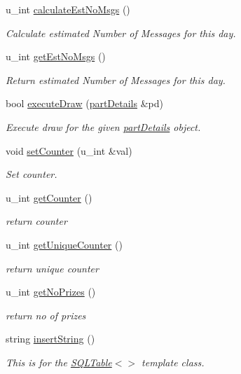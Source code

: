 \begin{CompactItemize}
u\_\-int \hyperlink{classDay_Daya6}{calculate\-Est\-No\-Msgs} ()
\begin{CompactList}\small\item\em Calculate estimated Number of Messages for this day.\item\end{CompactList}\item 
u\_\-int \hyperlink{classDay_Daya7}{get\-Est\-No\-Msgs} ()
\begin{CompactList}\small\item\em Return estimated Number of Messages for this day.\item\end{CompactList}\item 
bool \hyperlink{classDay_Daya8}{execute\-Draw} (\hyperlink{classpartDetails}{part\-Details} \&pd)
\begin{CompactList}\small\item\em Execute draw for the given \hyperlink{classpartDetails}{part\-Details} object.\item\end{CompactList}\item 
void \hyperlink{classDay_Daya9}{set\-Counter} (u\_\-int \&val)
\begin{CompactList}\small\item\em Set counter.\item\end{CompactList}\item 
u\_\-int \hyperlink{classDay_Daya10}{get\-Counter} ()
\begin{CompactList}\small\item\em return counter\item\end{CompactList}\item 
u\_\-int \hyperlink{classDay_Daya11}{get\-Unique\-Counter} ()
\begin{CompactList}\small\item\em return unique counter\item\end{CompactList}\item 
u\_\-int \hyperlink{classDay_Daya12}{get\-No\-Prizes} ()
\begin{CompactList}\small\item\em return no of prizes\item\end{CompactList}\item 
string \hyperlink{classDay_Daya13}{insert\-String} ()
\begin{CompactList}\small\item\em This is for the \hyperlink{classSQLTable}{SQLTable}$<$$>$ template class.\item\end{CompactList}\item 

\end{CompactItemize}
